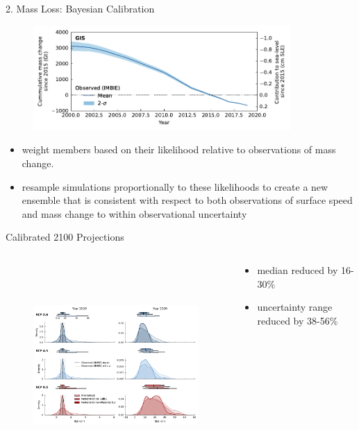 \documentclass[hide notes,intlimits]{beamer}
\begin{document}
\begin{frame}{2. Mass Loss: Bayesian Calibration}
  \begin{minipage}[t][4cm][t]{\textwidth}
    \begin{figure}
    \includegraphics[height=4cm]{GIS_hist_only_obs}
    \end{figure}
  \end{minipage}
  \begin{itemize}
  \item  weight members based on their likelihood relative to observations of mass change.
  \item resample simulations proportionally to these likelihoods to create a new ensemble that is consistent with respect to both  observations of surface speed and mass change to within observational uncertainty
  \end{itemize}
\end{frame}



\begin{frame}{Calibrated 2100 Projections}
\begin{columns}[c]
    \begin{column}{.5\textwidth}
    \begin{figure}
      \includegraphics[height=7.75cm]{sle_pdf_w_obs__calib_2010_2020_2020_2100}
    \end{figure}
    \end{column}
    \begin{column}{.5\textwidth}
  \begin{itemize}
  \item median reduced by 16-30\%
  \item uncertainty range reduced by 38-56\%
    \end{itemize}
    \end{column}
  \end{columns}
\end{frame}
\end{document}

